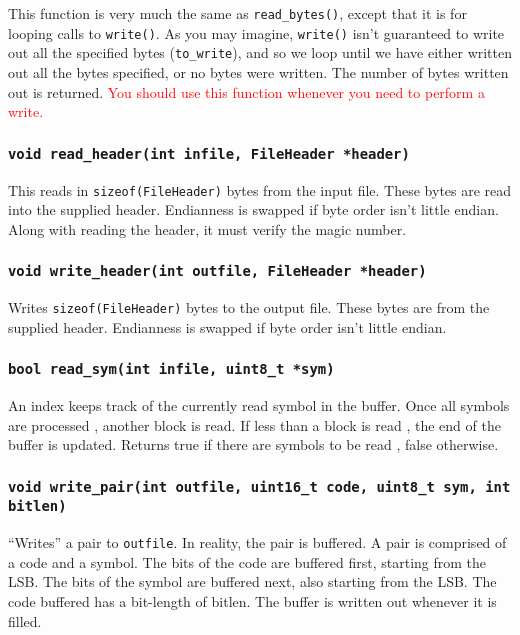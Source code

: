 \documentclass{article}
\begin{document}
This function is very much the same as \texttt{read\_bytes()}, except
that it is for looping calls to \texttt{write()}. As you may imagine,
\texttt{write()} isn't guaranteed to write out all the specified bytes
(\texttt{to\_write}), and so we loop until we have either written out
all the bytes specified, or no bytes were written. The number of bytes
written out is returned.  \textcolor{red}{You should use this function
whenever you need to perform a write.}


\subsubsection{\texttt{void read\_header(int infile, FileHeader *header)}}
This reads in \texttt{sizeof(FileHeader)} bytes from the input file.
These bytes are read into the supplied header. Endianness is swapped if
byte order isn't little endian. Along with reading the header, it must
verify the magic number.

\subsubsection{\texttt{void write\_header(int outfile, FileHeader *header)}}
Writes \texttt{sizeof(FileHeader)} bytes to the output file. These
bytes are from the supplied header. Endianness is swapped if byte order
isn't little endian.

\subsubsection{\texttt{bool read\_sym(int infile, uint8\_t *sym)}}
An index  keeps  track of the  currently  read  symbol  in the  buffer.
Once  all  symbols  are  processed , another  block is read. If less
than a block is read , the end of the  buffer  is  updated.  Returns
true if there  are  symbols  to be read , false  otherwise.

\subsubsection{\texttt{void write\_pair(int outfile, uint16\_t code,
uint8\_t sym, int bitlen)}}
``Writes'' a pair to \texttt{outfile}. In reality, the pair is buffered.
A pair is comprised of a code and a symbol.  The bits of the code are
buffered first, starting from the LSB.  The bits of the symbol are
buffered next, also starting from the LSB.  The code buffered has a
bit-length of bitlen. The buffer is written out whenever it is filled.
\end{document}
